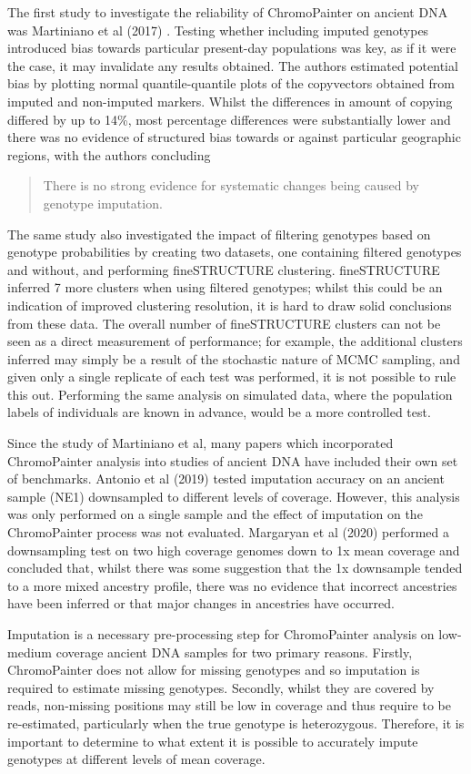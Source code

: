 The first study to investigate the reliability of ChromoPainter on ancient DNA was Martiniano et al (2017) \cite{Martiniano2017}. Testing whether including imputed genotypes introduced bias towards particular present-day populations was key, as if it were the case, it may invalidate any results obtained. The authors estimated potential bias by plotting normal quantile-quantile plots of the copyvectors obtained from imputed and non-imputed markers. Whilst the differences in amount of copying differed by up to 14\%, most percentage differences were substantially lower and there was no evidence of structured bias towards or against particular geographic regions, with the authors concluding \blockquote{There is no strong evidence for systematic changes being caused by genotype imputation.}. 

The same study also investigated the impact of filtering genotypes based on genotype probabilities by creating two datasets, one containing filtered genotypes and without, and performing fineSTRUCTURE clustering. fineSTRUCTURE inferred 7 more clusters when using filtered genotypes; whilst this could be an indication of improved clustering resolution, it is hard to draw solid conclusions from these data. The overall number of fineSTRUCTURE clusters can not be seen as a direct measurement of performance; for example, the additional clusters inferred may simply be a result of the stochastic nature of MCMC sampling, and given only a single replicate of each test was performed, it is not possible to rule this out. Performing the same analysis on simulated data, where the population labels of individuals are known in advance, would be a more controlled test. 

Since the study of Martiniano et al, many papers which incorporated ChromoPainter analysis into studies of ancient DNA have included their own set of benchmarks. Antonio et al (2019) \cite{antonio2019ancient} tested imputation accuracy on an ancient sample (NE1) downsampled to different levels of coverage. However, this analysis was only performed on a single sample and the effect of imputation on the ChromoPainter process was not evaluated. Margaryan et al (2020) performed a downsampling test on two high coverage genomes down to 1x mean coverage and concluded that, whilst there was some suggestion that the 1x downsample tended to a more mixed ancestry profile, there was no evidence that incorrect ancestries have been inferred or that major changes in ancestries have occurred. 

Imputation is a necessary pre-processing step for ChromoPainter analysis on low-medium coverage ancient DNA samples for two primary reasons. Firstly, ChromoPainter does not allow for missing genotypes and so imputation is required to estimate missing genotypes. Secondly, whilst they are covered by reads, non-missing positions may still be low in coverage and thus require to be re-estimated, particularly when the true genotype is heterozygous. Therefore, it is important to determine to what extent it is possible to accurately impute genotypes at different levels of mean coverage. 

